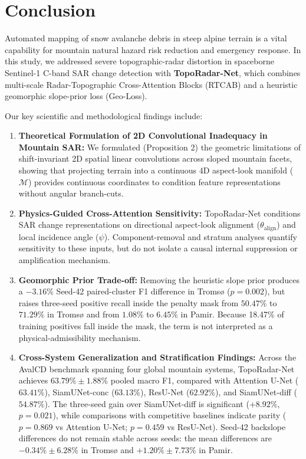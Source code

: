 \section{Conclusion}
\label{sec:conclusion}

Automated mapping of snow avalanche debris in steep alpine terrain is a vital capability for mountain natural hazard risk reduction and emergency response. In this study, we addressed severe topographic-radar distortion in spaceborne Sentinel-1 C-band SAR change detection with \textbf{TopoRadar-Net}, which combines multi-scale Radar-Topographic Cross-Attention Blocks (RTCAB) and a heuristic geomorphic slope-prior loss (Geo-Loss).

Our key scientific and methodological findings include:
\begin{enumerate}
    \item \textbf{Theoretical Formulation of 2D Convolutional Inadequacy in Mountain SAR:} We formulated (Proposition 2) the geometric limitations of shift-invariant 2D spatial linear convolutions across sloped mountain facets, showing that projecting terrain into a continuous 4D aspect-look manifold ($\mathcal{M}$) provides continuous coordinates to condition feature representations without angular branch-cuts.
    \item \textbf{Physics-Guided Cross-Attention Sensitivity:} TopoRadar-Net conditions SAR change representations on directional aspect-look alignment ($\theta_{\text{align}}$) and local incidence angle ($\psi$). Component-removal and stratum analyses quantify sensitivity to these inputs, but do not isolate a causal internal suppression or amplification mechanism.
    \item \textbf{Geomorphic Prior Trade-off:} Removing the heuristic slope prior produces a $-3.16\%$ Seed-42 paired-cluster F1 difference in Troms{\o} ($p = 0.002$), but raises three-seed positive recall inside the penalty mask from $50.47\%$ to $71.29\%$ in Troms{\o} and from $1.08\%$ to $6.45\%$ in Pamir. Because 18.47\% of training positives fall inside the mask, the term is not interpreted as a physical-admissibility mechanism.
    \item \textbf{Cross-System Generalization and Stratification Findings:} Across the AvalCD benchmark spanning four global mountain systems, TopoRadar-Net achieves $63.79\% \pm 1.88\%$ pooled macro F1, compared with Attention U-Net ($63.41\%$), SiamUNet-conc ($63.13\%$), ResU-Net ($62.92\%$), and SiamUNet-diff ($54.87\%$). The three-seed gain over SiamUNet-diff is significant ($+8.92\%$, $p = 0.021$), while comparisons with competitive baselines indicate parity ($p = 0.869$ vs Attention U-Net; $p = 0.459$ vs ResU-Net). Seed-42 backslope differences do not remain stable across seeds: the mean differences are $-0.34\% \pm 6.28\%$ in Troms{\o} and $+1.20\% \pm 7.73\%$ in Pamir.

\end{enumerate}
